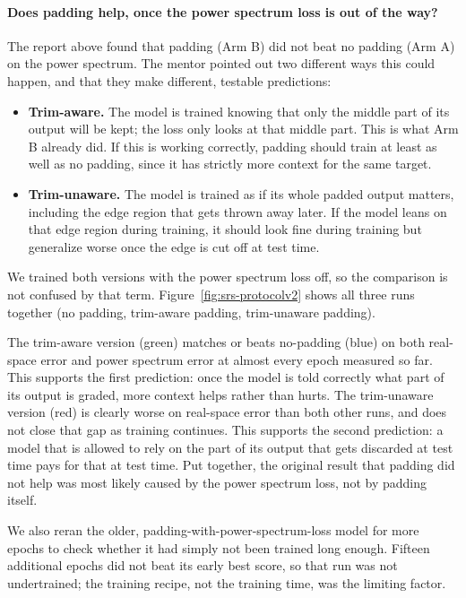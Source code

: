 \paragraph{Does padding help, once the power spectrum loss is out of the way?}
The report above found that padding (Arm B) did not beat no padding (Arm A) on
the power spectrum. The mentor pointed out two different ways this could
happen, and that they make different, testable predictions:
\begin{itemize}
  \item \textbf{Trim-aware.} The model is trained knowing that only the middle
  part of its output will be kept; the loss only looks at that middle part.
  This is what Arm B already did. If this is working correctly, padding should
  train at least as well as no padding, since it has strictly more context for
  the same target.
  \item \textbf{Trim-unaware.} The model is trained as if its whole padded
  output matters, including the edge region that gets thrown away later. If
  the model leans on that edge region during training, it should look fine
  during training but generalize worse once the edge is cut off at test time.
\end{itemize}
We trained both versions with the power spectrum loss off, so the comparison
is not confused by that term. Figure~\ref{fig:srs-protocolv2} shows all three
runs together (no padding, trim-aware padding, trim-unaware padding).

The trim-aware version (green) matches or beats no-padding (blue) on both
real-space error and power spectrum error at almost every epoch measured so
far. This supports the first prediction: once the model is told correctly what
part of its output is graded, more context helps rather than hurts. The
trim-unaware version (red) is clearly worse on real-space error than both
other runs, and does not close that gap as training continues. This supports
the second prediction: a model that is allowed to rely on the part of its
output that gets discarded at test time pays for that at test time. Put
together, the original result that padding did not help was most likely
caused by the power spectrum loss, not by padding itself.

We also reran the older, padding-with-power-spectrum-loss model for more
epochs to check whether it had simply not been trained long enough. Fifteen
additional epochs did not beat its early best score, so that run was not
undertrained; the training recipe, not the training time, was the limiting
factor.

